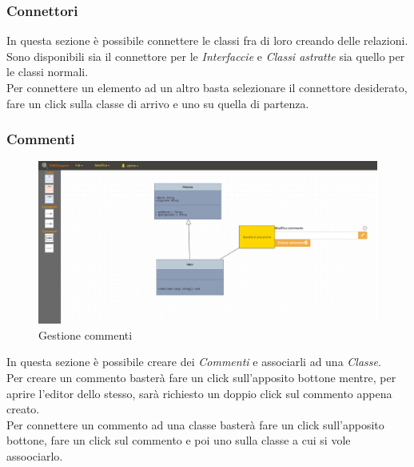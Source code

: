 		\subsubsection{Connettori}
			In questa sezione è possibile connettere le classi fra di loro creando delle relazioni.\\
			Sono disponibili sia il connettore per le \emph{Interfaccie} e \emph{Classi astratte} sia quello per le classi normali.\\
			Per connettere un elemento ad un altro basta selezionare il connettore desiderato, fare un click sulla classe di arrivo e uno su quella di partenza.\\
		\subsubsection{Commenti}
			\begin{figure}[H]
				\centering
					\includegraphics[width=1\linewidth]{res/img/designer1.png}
				\caption{Gestione commenti}
			\end{figure}
			In questa sezione  è possibile creare dei \emph{Commenti} e associarli ad una \emph{Classe}.\\
			Per creare un commento basterà fare un click sull'apposito bottone mentre, per aprire l'editor dello stesso, sarà richiesto un doppio click sul commento appena creato.\\
			Per connettere un commento ad una classe basterà fare un click sull'apposito bottone, fare un click sul commento e poi uno sulla classe a cui si vole assoociarlo.\\
